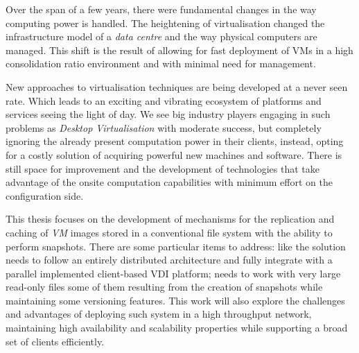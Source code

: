 
Over the span of a few years, there were fundamental changes in the way computing power is handled. The heightening of virtualisation changed the infrastructure model of a \textit{data centre} and the way physical computers are managed. This shift is the result of allowing for fast deployment of \glspl{VM} in a high consolidation ratio environment and with minimal need for management.

New approaches to virtualisation techniques are being developed at a never seen rate. Which leads to an exciting and vibrating ecosystem of platforms and services seeing the light of day. We see big industry players engaging in such problems as \textit{Desktop Virtualisation} with moderate success, but completely ignoring the already present computation power in their clients, instead, opting for a costly solution of acquiring powerful new machines and software. There is still space for improvement and the development of technologies that take advantage of the onsite computation capabilities with minimum effort on the configuration side.

This thesis focuses on the development of mechanisms for the replication and caching of \textit{VM} images stored in a conventional file system with the ability to perform snapshots. There are some particular items to address: like the solution needs to follow an entirely distributed architecture and fully integrate with a parallel implemented client-based \gls{VDI} platform; needs to work with very large read-only files some of them resulting from the creation of snapshots while maintaining some versioning features. This work will also explore the challenges and advantages of deploying such system in a high throughput network, maintaining high availability and scalability properties while supporting a broad set of clients efficiently. 


